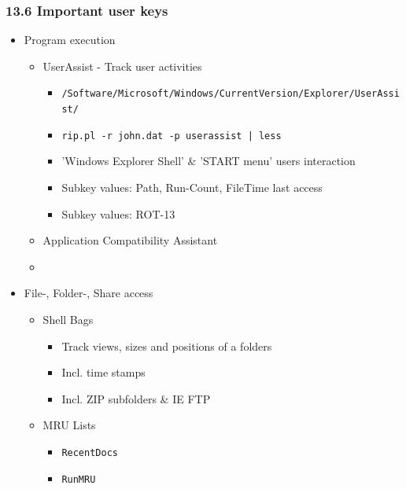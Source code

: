 \begin{frame}[fragile]
  \frametitle{13.6 Important user keys}
   \begin{itemize}
      \item Program execution
      \begin{itemize}
          \item UserAssist - Track user activities
              \begin{itemize}
		  \item \texttt{\scriptsize{/Software/Microsoft/Windows/CurrentVersion/Explorer/UserAssist/}}
		  \item \texttt{\scriptsize{rip.pl -r john.dat -p userassist | less}}
		  \item 'Windows Explorer Shell' \& 'START menu' users interaction
                  \item Subkey values: Path, Run-Count, FileTime last access
                  \item Subkey values: ROT-13
              \end{itemize}
          \item Application Compatibility Assistant
	  \item[]
      \end{itemize}
      \item File-, Folder-, Share access
      \begin{itemize}
          \item Shell Bags
              \begin{itemize}
                  \item Track views, sizes and positions of a folders
                  \item Incl. time stamps
		  \item Incl. ZIP subfolders \& IE FTP
              \end{itemize}
          \item MRU Lists
              \begin{itemize}
		  \item \texttt{RecentDocs}
		  \item \texttt{RunMRU}
              \end{itemize}
      \end{itemize}
   \end{itemize}
\end{frame}


